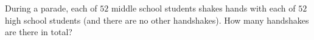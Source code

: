 During a parade, each of $52$ middle school students shakes hands with each of $52$ high school students (and there are no other handshakes). How many handshakes are there in total?
